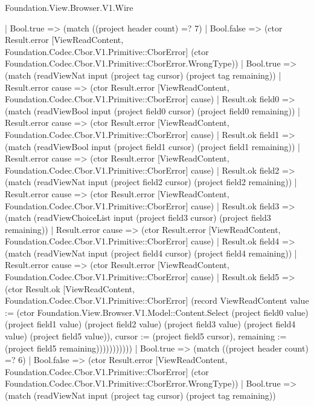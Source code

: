 \begin{lexlean}{Foundation.View.Browser.V1.Wire}
\begin{semanticmodule}
{                  | Bool.true => (match ((project header count) =? 7)
                    | Bool.false => (ctor Result.error [ViewReadContent, Foundation.Codec.Cbor.V1.Primitive::CborError] (ctor Foundation.Codec.Cbor.V1.Primitive::CborError.WrongType))
                    | Bool.true => (match (readViewNat input (project tag cursor) (project tag remaining))
                      | Result.error cause => (ctor Result.error [ViewReadContent, Foundation.Codec.Cbor.V1.Primitive::CborError] cause)
                      | Result.ok field0 => (match (readViewBool input (project field0 cursor) (project field0 remaining))
                        | Result.error cause => (ctor Result.error [ViewReadContent, Foundation.Codec.Cbor.V1.Primitive::CborError] cause)
                        | Result.ok field1 => (match (readViewBool input (project field1 cursor) (project field1 remaining))
                          | Result.error cause => (ctor Result.error [ViewReadContent, Foundation.Codec.Cbor.V1.Primitive::CborError] cause)
                          | Result.ok field2 => (match (readViewNat input (project field2 cursor) (project field2 remaining))
                            | Result.error cause => (ctor Result.error [ViewReadContent, Foundation.Codec.Cbor.V1.Primitive::CborError] cause)
                            | Result.ok field3 => (match (readViewChoiceList input (project field3 cursor) (project field3 remaining))
                              | Result.error cause => (ctor Result.error [ViewReadContent, Foundation.Codec.Cbor.V1.Primitive::CborError] cause)
                              | Result.ok field4 => (match (readViewNat input (project field4 cursor) (project field4 remaining))
                                | Result.error cause => (ctor Result.error [ViewReadContent, Foundation.Codec.Cbor.V1.Primitive::CborError] cause)
                                | Result.ok field5 => (ctor Result.ok [ViewReadContent, Foundation.Codec.Cbor.V1.Primitive::CborError] (record ViewReadContent {value := (ctor Foundation.View.Browser.V1.Model::Content.Select (project field0 value) (project field1 value) (project field2 value) (project field3 value) (project field4 value) (project field5 value)), cursor := (project field5 cursor), remaining := (project field5 remaining)}))))))))))
                | Bool.true => (match ((project header count) =? 6)
                  | Bool.false => (ctor Result.error [ViewReadContent, Foundation.Codec.Cbor.V1.Primitive::CborError] (ctor Foundation.Codec.Cbor.V1.Primitive::CborError.WrongType))
                  | Bool.true => (match (readViewNat input (project tag cursor) (project tag remaining))
}
\end{semanticmodule}
\end{lexlean}
